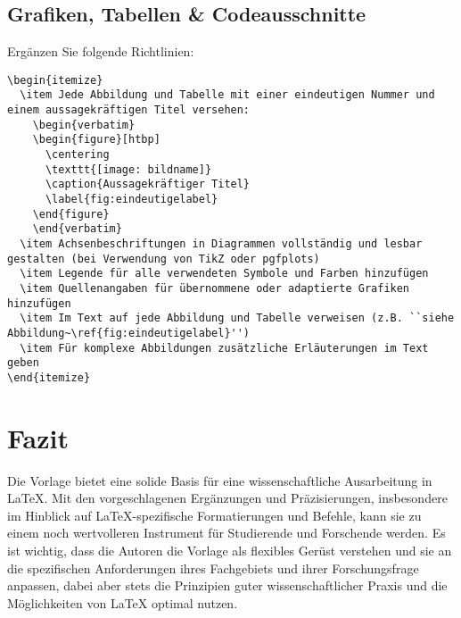 \documentclass[a4paper,12pt]{article}
\begin{document}
\subsection{Grafiken, Tabellen \& Codeausschnitte}

Ergänzen Sie folgende Richtlinien:

\begin{lstlisting}
\begin{itemize}
  \item Jede Abbildung und Tabelle mit einer eindeutigen Nummer und einem aussagekräftigen Titel versehen:
    \begin{verbatim}
    \begin{figure}[htbp]
      \centering
      \texttt{[image: bildname]}
      \caption{Aussagekräftiger Titel}
      \label{fig:eindeutigelabel}
    \end{figure}
    \end{verbatim}
  \item Achsenbeschriftungen in Diagrammen vollständig und lesbar gestalten (bei Verwendung von TikZ oder pgfplots)
  \item Legende für alle verwendeten Symbole und Farben hinzufügen
  \item Quellenangaben für übernommene oder adaptierte Grafiken hinzufügen
  \item Im Text auf jede Abbildung und Tabelle verweisen (z.B. ``siehe Abbildung~\ref{fig:eindeutigelabel}'')
  \item Für komplexe Abbildungen zusätzliche Erläuterungen im Text geben
\end{itemize}
\end{lstlisting}

\section{Fazit}

Die Vorlage bietet eine solide Basis für eine wissenschaftliche Ausarbeitung in LaTeX. Mit den vorgeschlagenen Ergänzungen und Präzisierungen, insbesondere im Hinblick auf LaTeX-spezifische Formatierungen und Befehle, kann sie zu einem noch wertvolleren Instrument für Studierende und Forschende werden. Es ist wichtig, dass die Autoren die Vorlage als flexibles Gerüst verstehen und sie an die spezifischen Anforderungen ihres Fachgebiets und ihrer Forschungsfrage anpassen, dabei aber stets die Prinzipien guter wissenschaftlicher Praxis und die Möglichkeiten von LaTeX optimal nutzen.
\end{document}
